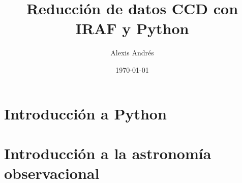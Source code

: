 \documentclass[11pt, letterpaper]{report}
\title{\bf\Huge Reducción de datos CCD con IRAF y Python}
\author{Alexis Andrés}
\date{\today}
\begin{document}
\renewcommand*\thepart{\arabic{part}}
\renewcommand{\partname}{Unidad}
\renewcommand{\chaptername}{Clase}
\renewcommand{\tablename}{Tabla}

\maketitle

\tableofcontents

\part{Introducción a Python}





\part{Introducción a la astronomía observacional}

\end{document}
